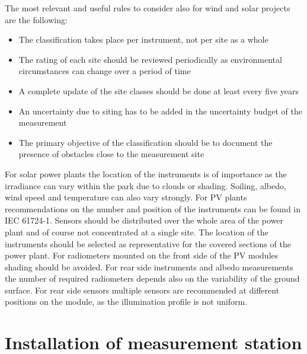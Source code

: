 The most relevant and useful rules to consider also for wind and solar projects are the following:
\begin{itemize}
    \item The classification takes place per instrument, not per site as a whole
    \item The rating of each site should be reviewed periodically as environmental circumstances can change over a period of time
    \item A complete update of the site classes should be done at least every five years
    \item An uncertainty due to siting has to be added in the uncertainty budget of the measurement
    \item The primary objective of the classification should be to document the presence of obstacles close to the measurement site
\end{itemize}


For solar power plants the location of the instruments is of importance as the irradiance can vary within the park due to clouds or shading. Soiling, albedo, wind speed and temperature can also vary strongly. For PV plants recommendations on the number and position of the instruments can be found in IEC 61724-1. Sensors should be distributed over the whole area of the power plant and of course not concentrated at a single site. The location of the instruments should be selected as representative for the covered sections of the power plant. For radiometers mounted on the front side of the PV modules shading should be avoided. For rear side instruments and albedo measurements the number of required radiometers depends also on the variability of the ground surface. For rear side sensors multiple sensors are recommended at different positions on the module, as the illumination profile is not uniform.


\section{Installation of measurement station {\color{blue}{needs attention}}}\label{sec:installation-veification}

{\color{magenta}{comment SW 210715: I removed the word "siting" from the title. This should be all together discussed in the section on instrument location. I commented out the text summarizing the WMO info here as it did seem helpful to me not even for the previous section on location. I assume a general text refering to the CIMO guide will open the section. }}
 
